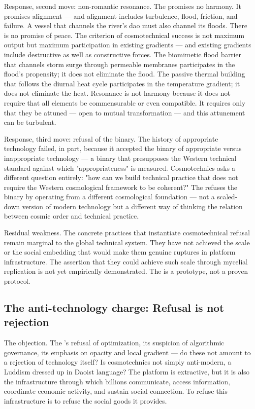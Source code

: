 Response, second move: non-romantic resonance. The   promises no harmony. It promises alignment — and alignment includes turbulence, flood, friction, and failure. A vessel that channels the river's dao must also channel its floods. There is no promise of peace. The criterion of cosmotechnical success is not maximum output but maximum participation in existing gradients — and existing gradients include destructive as well as constructive forces. The biomimetic flood barrier that channels storm surge through permeable membranes participates in the flood's propensity; it does not eliminate the flood. The passive thermal building that follows the diurnal heat cycle participates in the temperature gradient; it does not eliminate the heat. Resonance is not harmony because it does not require that all elements be commensurable or even compatible. It requires only that they be attuned — open to mutual transformation — and this attunement can be turbulent.

Response, third move: refusal of the binary. The history of appropriate technology failed, in part, because it accepted the binary of appropriate versus inappropriate technology — a binary that presupposes the Western technical standard against which "appropriateness" is measured. Cosmotechnics asks a different question entirely: "how can we build technical practice that does not require the Western cosmological framework to be coherent?" The  refuses the binary by operating from a different cosmological foundation — not a scaled-down version of modern technology but a different way of thinking the relation between cosmic order and technical practice.

Residual weakness. The concrete practices that instantiate cosmotechnical refusal remain marginal to the global technical system. They have not achieved the scale or the social embedding that would make them genuine ruptures in platform infrastructure. The assertion that they could achieve such scale through mycelial replication is not yet empirically demonstrated. The  is a prototype, not a proven protocol.

\subsection{The anti-technology charge: Refusal is not rejection}

The objection. The   's refusal of optimization, its suspicion of algorithmic governance, its emphasis on opacity and local gradient — do these not amount to a rejection of technology itself? Is cosmotechnics not simply anti-modern, a Luddism dressed up in Daoist language? The platform is extractive, but it is also the infrastructure through which billions communicate, access information, coordinate economic activity, and sustain social connection. To refuse this infrastructure is to refuse the social goods it provides.

